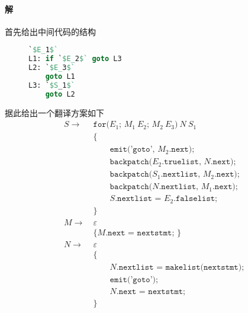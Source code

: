 \documentclass{article}
\begin{document}
\paragraph{解}
首先给出中间代码的结构
\begin{figure}[H]
    \centering
\begin{lstlisting}[language = Pascal, alsolanguage = C]
    `$E_1$`
L1: if `$E_2$` goto L3
L2: `$E_3$`
    goto L1
L3: `$S_1$`
    goto L2
\end{lstlisting}
\end{figure}
据此给出一个翻译方案如下
\begin{align*}
    S \rightarrow\  &\texttt{for(}E_1\texttt{; }M_1\ E_2\texttt{; }M_2\ E_3\texttt{)}\ N\ S_1 \\
                    &\texttt{\{} \\
                    &\qquad \texttt{emit('goto', }M_2\texttt{.next);} \\
                    &\qquad \texttt{backpatch(}E_2\texttt{.truelist, }N\texttt{.next);} \\
                    &\qquad \texttt{backpatch(}S_1\texttt{.nextlist, }M_2\texttt{.next);} \\
                    &\qquad \texttt{backpatch(}N\texttt{.nextlist, }M_1\texttt{.next);} \\
                    &\qquad S\texttt{.nextlist = }E_2\texttt{.falselist;} \\
                    &\texttt{\}}\\
    M \rightarrow\  &\varepsilon \\ &\texttt{\{ }M\texttt{.next = nextstmt; \}}\\
    N \rightarrow\  &\varepsilon \\
                    &\texttt{\{} \\
                    &\qquad N\texttt{.nextlist = makelist(nextstmt);} \\
                    &\qquad \texttt{emit('goto');} \\
                    &\qquad N\texttt{.next = nextstmt;} \\
                    &\texttt{\}}\\
\end{align*}
\end{document}
